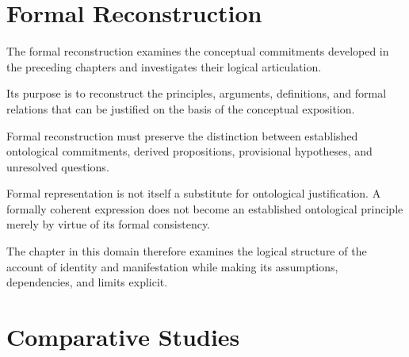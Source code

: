 



\section*{Formal Reconstruction}

The formal reconstruction examines the conceptual
commitments developed in the preceding chapters
and investigates their logical articulation.

Its purpose is to reconstruct the principles,
arguments, definitions, and formal relations
that can be justified on the basis of the
conceptual exposition.

Formal reconstruction must preserve the distinction
between established ontological commitments,
derived propositions, provisional hypotheses,
and unresolved questions.

Formal representation is not itself a substitute
for ontological justification. A formally coherent
expression does not become an established
ontological principle merely by virtue of its
formal consistency.

The chapter in this domain therefore examines
the logical structure of the account of identity
and manifestation while making its assumptions,
dependencies, and limits explicit.







\section*{Comparative Studies}

